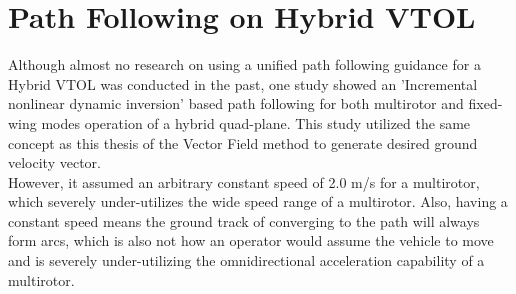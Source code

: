 \section{Path Following on Hybrid VTOL}
Although almost no research on using a unified path following guidance for a Hybrid VTOL was conducted in the past, one study\cite{zhou_incremental_nodate} showed an 'Incremental nonlinear dynamic inversion' based path following for both multirotor and fixed-wing modes operation of a hybrid quad-plane. This study utilized the same concept as this thesis of the Vector Field method to generate desired ground velocity vector.\\

However, it assumed an arbitrary constant speed of 2.0 m/s for a multirotor, which severely under-utilizes the wide speed range of a multirotor. Also, having a constant speed means the ground track of converging to the path will always form arcs, which is also not how an operator would assume the vehicle to move and is severely under-utilizing the omnidirectional acceleration capability of a multirotor.